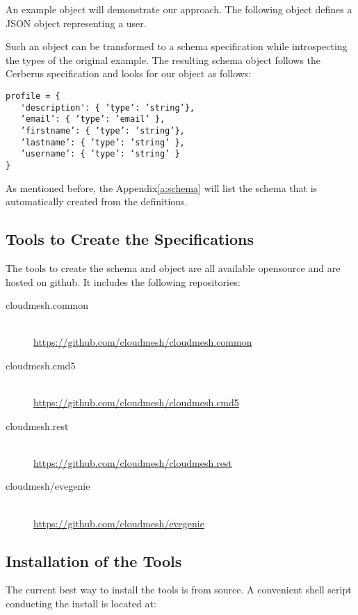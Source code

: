 \documentclass[9pt,twocolumn,twoside]{styles/osajnl}
\begin{document}
An example object will demonstrate our approach. The following object
defines a JSON object representing a user. 



 
Such an object can be transformed to a schema specification 
while introspecting the types of the original example. The resulting
schema object follows the Cerberus \cite{??} specification and looks
for our object as follows:

\begin{Verbatim}
profile = {  
   'description': { ’type’: ’string’},  
   ’email’: { ’type’: ’email’ },  
   ’firstname’: { ’type’: ’string’},  
   ’lastname’: { ’type’: ’string’ },   
   ’username’: { ’type’: ‘string’ } 
}  
\end{Verbatim}

As mentioned before, the Appendix\ref{a:schema} will list the schema
that is automatically created from the definitions.

\subsection{Tools to Create the Specifications}

The tools to create the schema and object are all available opensource
and are hosted on github. It includes the following repositories:

\begin{description}
\item[cloudmesh.common] ~\\
  \url{https://github.com/cloudmesh/cloudmesh.common}
\item[cloudmesh.cmd5] ~\\
  \url{https://github.com/cloudmesh/cloudmesh.cmd5}
\item[cloudmesh.rest] ~\\
  \url{https://github.com/cloudmesh/cloudmesh.rest}
\item[cloudmesh/evegenie] ~\\
  \url{https://github.com/cloudmesh/evegenie}
\end{description}

\subsection{Installation of the Tools}

The current best way to install the tools is from source. A convenient
shell script conducting the install is located at:
\end{document}
